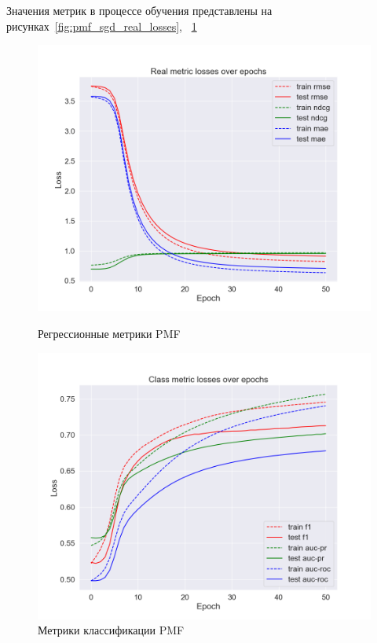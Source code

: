 Значения метрик в процессе обучения представлены на рисунках~\ref{fig:pmf_sgd_real_losses}, ~\ref{fig:pmf_sgd_class_losses}

\begin{figure}[h!]
\centering
\begin{minipage}{.5\textwidth}
\centering
\includegraphics[width=1.0\linewidth]{images/pmf_sgd/real_losses}
\caption{Регрессионные метрики PMF}
\label{fig:pmf_sgd_real_losses}
\end{minipage}%
\begin{minipage}{.5\textwidth}
\centering
\includegraphics[width=1.0\linewidth]{images/pmf_sgd/class_losses}
\caption{Метрики классификации PMF}
\label{fig:pmf_sgd_class_losses}
\end{minipage}
\end{figure}



